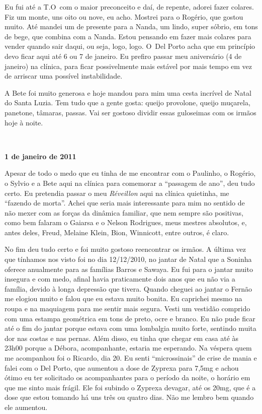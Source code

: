 Eu fui até a T.O\, com o maior preconceito e daí, de repente, adorei fazer
colares. Fiz um monte, uns oito ou nove, eu acho. Mostrei para o
Rogério, que gostou muito. Até mandei um de presente para a Nanda, um
lindo, super sóbrio, em tons de bege, que combina com a Nanda. Estou
pensando em fazer mais colares para vender quando sair daqui, ou seja,
logo, logo. O~Del Porto acha que em princípio devo ficar aqui até 6 ou 7
de janeiro. Eu prefiro passar meu aniversário (4 de janeiro) na clínica,
para ficar possivelmente mais estável por mais tempo em vez de arriscar
uma possível instabilidade.

A Bete foi muito generosa e hoje mandou para mim uma cesta incrível de
Natal do Santa Luzia. Tem tudo que a gente gosta: queijo provolone,
queijo muçarela, panetone, tâmaras, passas. Vai ser gostoso dividir
essas guloseimas com os irmãos hoje à noite.

\begin{center}\asterisc{}​\end{center}


\begin{flushright}\textbf{1 de janeiro de 2011}\end{flushright}


Apesar de todo o medo que eu tinha de me encontrar com o Paulinho, o
Rogério, o Sylvio e a Bete aqui na clínica para comemorar a ``passagem
de ano'', deu tudo certo. Eu pretendia passar o meu \emph{Réveillon}
aqui na clínica quietinha, me ``fazendo de morta''. Achei que seria mais
interessante para mim no sentido de não mexer com as forças da dinâmica
familiar, que nem sempre são positivas, como bem falaram o Gaiarsa e o
Nelson Rodrigues, meus mestres absolutos, e, antes deles, Freud, Melaine
Klein, Bion, Winnicott, entre outros, é claro.

No fim deu tudo certo e foi muito gostoso reencontrar os irmãos. A 
última vez que tínhamos nos visto foi no dia 12/12/2010, no jantar de
Natal que a Soninha oferece anualmente para as famílias Barros e Sawaya.
Eu fui para o jantar muito insegura e com medo, afinal havia
praticamente dois anos que eu não via a família, devido à longa
depressão que tivera. Quando cheguei ao jantar o Fernão me elogiou
muito e falou que eu estava muito bonita. Eu caprichei mesmo na roupa e
na maquiagem para me sentir mais segura. Vesti um vestidão comprido com
uma estampa geométrica em tons de preto, ocre e branco. Eu não pude
ficar até o fim do jantar porque estava com uma lombalgia muito forte,
sentindo muita dor nas costas e nas pernas. Além disso, eu tinha que
chegar em casa até às 23h00 porque a Débora, acompanhante, estaria me
esperando. Na véspera quem me acompanhou foi o Ricardo, dia 20. Eu senti
``microssinais'' de crise de mania e falei com o Del Porto, que aumentou
a dose de Zyprexa para 7,5mg e achou ótimo eu ter solicitado os
acompanhantes para o período da noite, o horário em que me sinto mais
frágil. Ele foi subindo o Zyprexa devagar, até os 20mg, que é a dose que
estou tomando há uns três ou quatro dias. Não me lembro bem quando ele
aumentou.

